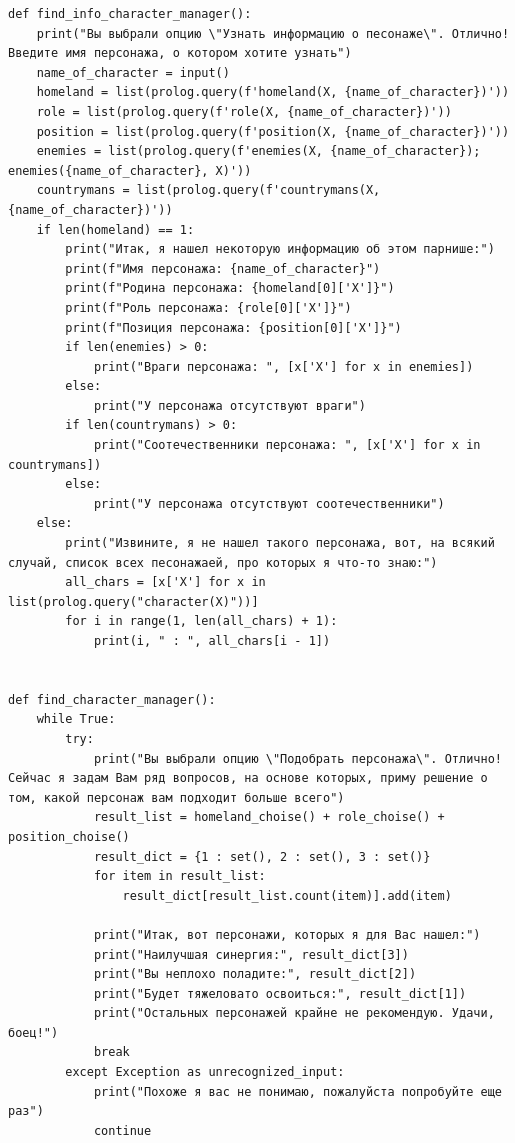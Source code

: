 \documentclass[14pt]{article}
\begin{document}
\begin{center}
\begin{verbatim}
def find_info_character_manager():
    print("Вы выбрали опцию \"Узнать информацию о песонаже\". Отлично! Введите имя персонажа, о котором хотите узнать")
    name_of_character = input()
    homeland = list(prolog.query(f'homeland(X, {name_of_character})'))
    role = list(prolog.query(f'role(X, {name_of_character})'))
    position = list(prolog.query(f'position(X, {name_of_character})'))
    enemies = list(prolog.query(f'enemies(X, {name_of_character}); enemies({name_of_character}, X)'))
    countrymans = list(prolog.query(f'countrymans(X, {name_of_character})'))
    if len(homeland) == 1:
        print("Итак, я нашел некоторую информацию об этом парнише:")
        print(f"Имя персонажа: {name_of_character}")
        print(f"Родина персонажа: {homeland[0]['X']}")
        print(f"Роль персонажа: {role[0]['X']}")
        print(f"Позиция персонажа: {position[0]['X']}")
        if len(enemies) > 0:
            print("Враги персонажа: ", [x['X'] for x in enemies])
        else:
            print("У персонажа отсутствуют враги")
        if len(countrymans) > 0:
            print("Соотечественники персонажа: ", [x['X'] for x in countrymans])
        else:
            print("У персонажа отсутствуют соотечественники")
    else:
        print("Извините, я не нашел такого персонажа, вот, на всякий случай, список всех песонажаей, про которых я что-то знаю:")
        all_chars = [x['X'] for x in list(prolog.query("character(X)"))]
        for i in range(1, len(all_chars) + 1):
            print(i, " : ", all_chars[i - 1])


def find_character_manager():
    while True:
        try:
            print("Вы выбрали опцию \"Подобрать персонажа\". Отлично! Сейчас я задам Вам ряд вопросов, на основе которых, приму решение о том, какой персонаж вам подходит больше всего")
            result_list = homeland_choise() + role_choise() + position_choise()
            result_dict = {1 : set(), 2 : set(), 3 : set()}
            for item in result_list:
                result_dict[result_list.count(item)].add(item)
            
            print("Итак, вот персонажи, которых я для Вас нашел:")
            print("Наилучшая синергия:", result_dict[3])
            print("Вы неплохо поладите:", result_dict[2])
            print("Будет тяжеловато освоиться:", result_dict[1])
            print("Остальных персонажей крайне не рекомендую. Удачи, боец!")
            break
        except Exception as unrecognized_input:
            print("Похоже я вас не понимаю, пожалуйста попробуйте еще раз")
            continue
    

\end{verbatim}
\end{center}
\end{document}
